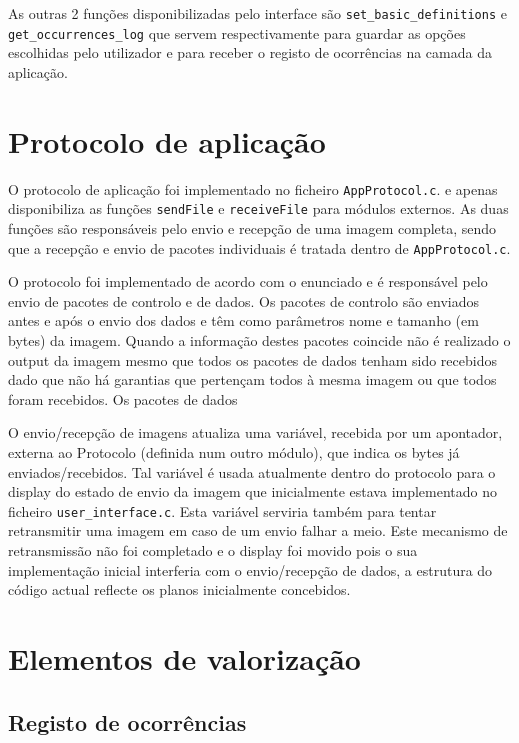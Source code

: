 \documentclass[11pt,a4paper,reqno]{report}
\numberwithin{equation}{section}
\begin{document}
As outras 2 funções disponibilizadas pelo interface são \verb|set_basic_definitions| e \verb|get_occurrences_log| que servem respectivamente para guardar as opções escolhidas pelo utilizador e para receber o registo de ocorrências na camada da aplicação.


\chapter{Protocolo de aplicação}

O protocolo de aplicação foi implementado no ficheiro \verb|AppProtocol.c|. e apenas disponibiliza as funções \verb|sendFile| e \verb|receiveFile| para módulos externos. As duas funções são responsáveis pelo envio e recepção de uma imagem completa, sendo que a recepção e envio de pacotes individuais é tratada dentro de \verb|AppProtocol.c|.

O protocolo foi implementado de acordo com o enunciado e é responsável pelo envio de pacotes de controlo e de dados.
Os pacotes de controlo são enviados antes e após o envio dos dados e têm como parâmetros  nome e tamanho (em bytes) da imagem.
Quando a informação destes pacotes coincide não é realizado o output da imagem mesmo que todos os pacotes de dados tenham sido recebidos dado que não há garantias que pertençam  todos à mesma imagem ou que todos foram recebidos.
Os pacotes de dados

O envio/recepção de imagens atualiza uma variável, recebida por um apontador, externa ao Protocolo (definida num outro módulo), que indica os bytes já enviados/recebidos. Tal variável é usada atualmente dentro do protocolo para o display do estado de envio da imagem que inicialmente estava implementado no ficheiro \verb|user_interface.c|. Esta variável serviria também para tentar retransmitir uma imagem em caso de um envio falhar a meio. Este mecanismo de retransmissão não foi completado e o display foi movido pois o sua implementação inicial interferia com o envio/recepção de dados, a estrutura do código actual reflecte os planos inicialmente concebidos.

\chapter{Elementos de valorização}

\section{Registo de ocorrências}
\end{document}
